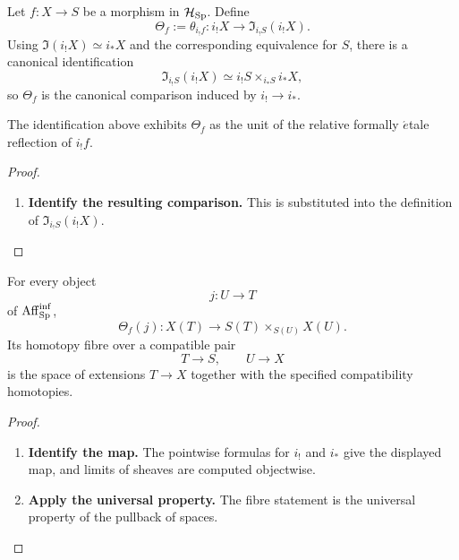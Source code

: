 \begin{construction}
\label{con:formal-lifting-comparison}
Let \(f:X\to S\) be a morphism in \(\mathcal H_{\operatorname{Sp}}\). Define
\[
    \Theta_f
    :=
    \theta_{i_!f}:
    i_!X
    \longrightarrow
    \Im_{i_!S}(i_!X).
\]
Using \(\Im(i_!X)\simeq i_*X\) and the corresponding equivalence for \(S\),
there is a canonical identification
\[
    \Im_{i_!S}(i_!X)
    \simeq
    i_!S\times_{i_*S}i_*X,
\]
so \(\Theta_f\) is the canonical comparison induced by \(i_!\to i_*\).
\end{construction}

\begin{proposition}
\label{prop:theta-is-etalification-unit}
The identification above exhibits \(\Theta_f\) as the unit of the relative
formally \(\acute{e}\)tale reflection of \(i_!f\).
\end{proposition}

\begin{proof}
\leavevmode
\begin{enumerate}[label=\textup{(\arabic*)}]
    \item \textbf{Identify the resulting comparison.}
    This is  substituted into the definition of
    \(\Im_{i_!S}(i_!X)\).
\end{enumerate}
\end{proof}

\begin{proposition}
\label{prop:formal-lifting-pointwise}
For every object
\[
    j:U\longrightarrow T
\]
of \(\operatorname{Aff}_{\operatorname{Sp}}^{\inf}\),
\[
    \Theta_f(j):
    X(T)
    \longrightarrow
    S(T)\times_{S(U)}X(U).
\]
Its homotopy fibre over a compatible pair
\[
    T\longrightarrow S,
    \qquad
    U\longrightarrow X
\]
is the space of extensions \(T\to X\) together with the specified
compatibility homotopies.
\end{proposition}

\begin{proof}
\leavevmode
\begin{enumerate}[label=\textup{(\arabic*)}]
    \item \textbf{Identify the map.}
    The pointwise formulas for \(i_!\) and \(i_*\) give the displayed map, and limits of
    sheaves are computed objectwise.

    \item \textbf{Apply the universal property.}
    The fibre statement is the universal property of the pullback of spaces.
\end{enumerate}
\end{proof}

